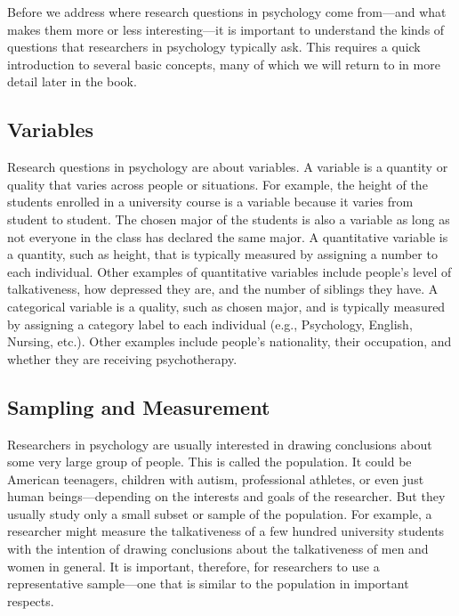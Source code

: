  Before we address where research questions in psychology come from---and what makes them more or less interesting---it is important to understand the kinds of questions that researchers in psychology typically ask. This requires a quick introduction to several basic concepts, many of which we will return to in more detail later in the book.

 \subsection{Variables}
 Research questions in psychology are about variables. A variable is a quantity or quality that varies across people or situations. For example, the height of the students enrolled in a university course is a variable because it varies from student to student. The chosen major of the students is also a variable as long as not everyone in the class has declared the same major. A quantitative variable is a quantity, such as height, that is typically measured by assigning a number to each individual. Other examples of quantitative variables include people's level of talkativeness, how depressed they are, and the number of siblings they have. A categorical variable is a quality, such as chosen major, and is typically measured by assigning a category label to each individual (e.g., Psychology, English, Nursing, etc.). Other examples include people's nationality, their occupation, and whether they are receiving psychotherapy.

\subsection{Sampling and Measurement}
Researchers in psychology are usually interested in drawing conclusions about some very large group of people. This is called the population. It could be American teenagers, children with autism, professional athletes, or even just human beings---depending on the interests and goals of the researcher. But they usually study only a small subset or sample of the population. For example, a researcher might measure the talkativeness of a few hundred university students with the intention of drawing conclusions about the talkativeness of men and women in general. It is important, therefore, for researchers to use a representative sample---one that is similar to the population in important respects.

